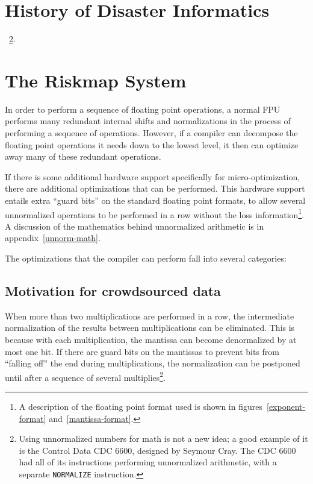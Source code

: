 \section{History of Disaster Informatics}

~\ref{ch1:riskmap}.

\section{The Riskmap System}\label{ch1:riskmap}

In order to perform a sequence of floating point operations, a normal FPU
performs many redundant internal shifts and normalizations in the process of
performing a sequence of operations.  However, if a compiler can decompose the
floating point operations it needs down to the lowest level, it then can
optimize away many of these redundant operations.  

If there is some additional hardware support specifically for
micro-optimization, there are additional optimizations that can be performed.
This hardware support entails extra ``guard bits'' on the standard floating
point formats, to allow several unnormalized operations to be performed in a row
without the loss information\footnote{A description of the floating point format
used is shown in figures~\ref{exponent-format} and~\ref{mantissa-format}.}.  A
discussion of the mathematics behind unnormalized arithmetic is in
appendix~\ref{unnorm-math}.

The optimizations that the compiler can perform fall into several categories:

\subsection{Motivation for crowdsourced data}

When more than two multiplications are performed in a row, the intermediate
normalization of the results between multiplications can be eliminated.  This is
because with each multiplication, the mantissa can become denormalized by at
most one bit.  If there are guard bits on the mantissas to prevent bits from
``falling off'' the end during multiplications, the normalization can be
postponed until after a sequence of several multiplies\footnote{Using
unnormalized numbers for math is not a new idea; a good example of it is the
Control Data CDC 6600, designed by Seymour Cray.  \cite{thornton:cdc6600} The
CDC 6600 had all of its instructions performing unnormalized arithmetic, with a
separate {\tt NORMALIZE} instruction.}.

